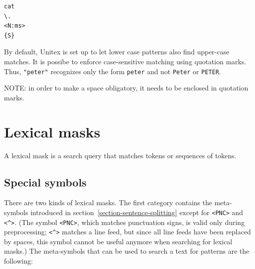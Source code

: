 \begin{verbatim}
cat
\.
<N:ms>
{S}
\end{verbatim}

\noindent By default, Unitex is set up to let lower case patterns also find
upper-case matches. It is possibe to enforce case-sensitive matching using quotation marks. Thus,
\verb+"peter"+ recognizes only the form \verb+peter+ and not \verb+Peter+
or \verb+PETER+.

\bigskip
\noindent NOTE: in order to make a space obligatory, it needs to  be  enclosed 
in quotation marks.


\section{Lexical masks}
A lexical mask is a search query that matches tokens or sequences of tokens.

\subsection{Special symbols}
\label{section-special-symbols}

There are two kinds of lexical masks. The first category contains the meta-symbols 
introduced in section~\ref{section-sentence-splitting} except for \verb$<PNC>$ and \verb+<^>+.
(The symbol \verb$<PNC>$, which matches punctuation signs, is valid only
during preprocessing; \verb+<^>+ matches a line feed, but
since all line feeds have been replaced by spaces, this symbol cannot be
useful anymore when searching for lexical masks.) The meta-symbols that can be used to search a text for patterns are
the following:

